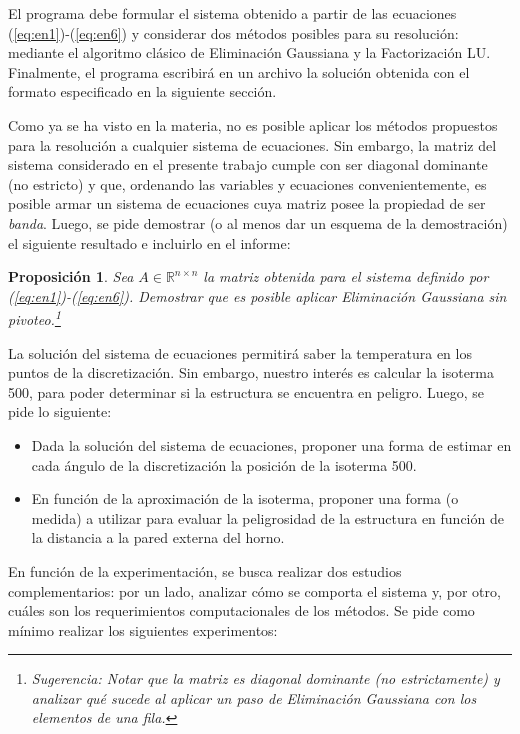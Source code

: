\documentclass[11pt, a4paper, spanish]{article}
\newtheorem{prop}{Proposición}
\begin{document}
\begin{appendices}
      El programa debe formular el sistema obtenido a partir de las ecuaciones (\ref{eq:en1})-(\ref{eq:en6}) y considerar dos métodos posibles para su resolución: mediante el algoritmo clásico de Eliminación Gaussiana y la Factorización LU. Finalmente, el programa escribirá en un archivo la solución obtenida con el formato especificado en la siguiente sección.

      Como ya se ha visto en la materia, no es posible aplicar los métodos propuestos para la resolución a cualquier sistema de ecuaciones. Sin embargo, la matriz del sistema considerado en el presente trabajo cumple con ser diagonal dominante (no estricto) y que, ordenando las variables y ecuaciones convenientemente, es posible armar un sistema de ecuaciones cuya matriz posee la propiedad de ser \emph{banda}. Luego, se pide demostrar (o al menos dar un esquema de la demostración) el siguiente resultado e incluirlo en el informe:

      \begin{prop}
        Sea $A \in \mathbb{R}^{n \times n}$ la matriz obtenida para el sistema definido por (\ref{eq:en1})-(\ref{eq:en6}). Demostrar que es posible aplicar Eliminación Gaussiana sin pivoteo.\footnote{Sugerencia: Notar que la matriz es diagonal dominante (no estrictamente) y analizar qué sucede al aplicar un paso de Eliminación Gaussiana con los elementos de una fila.}
      \end{prop}

      La solución del sistema de ecuaciones permitirá saber la temperatura en los puntos de la discretización. Sin embargo, nuestro interés es calcular la isoterma 500, para poder determinar si la estructura se encuentra en peligro. Luego, se pide lo siguiente:

      \begin{itemize}
        \item Dada la solución del sistema de ecuaciones, proponer una forma de estimar en cada ángulo de la discretización la posición de la isoterma 500.
        \item En función de la aproximación de la isoterma, proponer una forma (o medida) a utilizar para evaluar la peligrosidad de la estructura en función de la distancia a la pared externa del horno.
      \end{itemize}

      En función de la experimentación, se busca realizar dos estudios complementarios: por un lado, analizar cómo se comporta el sistema y, por otro, cuáles son los requerimientos computacionales de los métodos. Se pide como mínimo realizar los siguientes experimentos:


\end{appendices}
\end{document}

